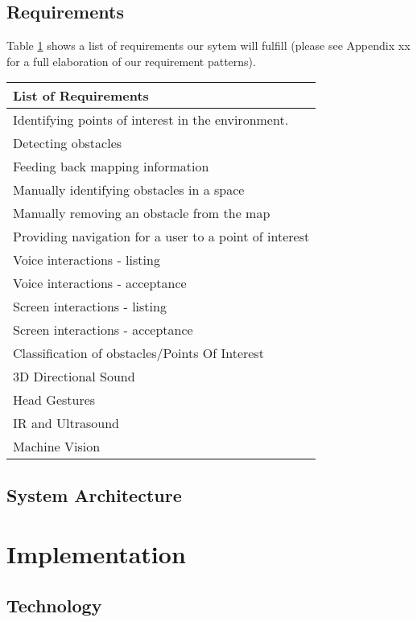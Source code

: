 \documentclass[prodmode,acmtecs]{acmsmall} %
\begin{document}
\subsection{Requirements}
Table \ref{table:1} shows a list of requirements our sytem will fulfill (please see Appendix xx for a full elaboration of our requirement patterns).
\begin{table}[h!]
\renewcommand{\arraystretch}{1.5}
\centering
\begin{tabular}{| l ||} 
 \hline
 List of Requirements \\ [0.5ex] 
 \hline\hline
 Identifying points of interest in the environment. \\ 
 \hline
 Detecting obstacles \\
 \hline
 Feeding back mapping information \\
 \hline
 Manually identifying obstacles in a space \\
 \hline
 Manually removing an obstacle from the map \\ 
 \hline
 Providing navigation for a user to a point of interest \\ 
 \hline
 Voice interactions - listing \\ 
 \hline
 Voice interactions - acceptance \\ 
 \hline
 Screen interactions - listing \\ 
 \hline
 Screen interactions - acceptance \\ 
 \hline
 Classification of obstacles/Points Of Interest \\ 
 \hline
 3D Directional Sound \\ 
 \hline
 Head Gestures \\ 
 \hline
 IR and Ultrasound \\ 
 \hline
 Machine Vision \\ 
 \hline
\end{tabular}
\label{table:1}
\end{table}

\subsection{System Architecture}

\section{Implementation}

\subsection{Technology}
\end{document}
